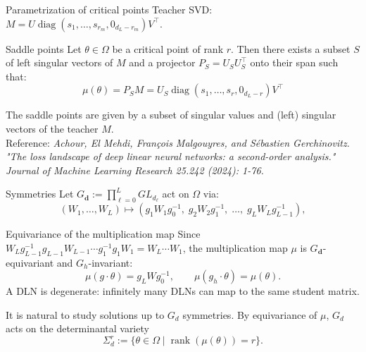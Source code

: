 \documentclass[aspectratio=169,11pt]{beamer}
\begin{document}
\begin{frame}{Parametrization of critical points}
Teacher SVD: \(M=U\operatorname{diag}(s_1,\ldots,s_{r_m},0_{d_L-r_m})V^{\top}\).
\begin{block}{Saddle points}
    Let $\theta\in\Omega$ be a critical point of rank $r$. Then there exists a subset $S$ of left singular vectors of $M$ and a projector $P_S=U_S U_S^{\top}$ onto their span such that:
    \[
    \mu(\theta) = P_S M = U_S\operatorname{diag}(s_1,\ldots,s_{r},0_{d_L-r})V^{\top}
    \]
\end{block}
The saddle points are given by a subset of singular values and (left) singular vectors of the teacher $M$.
\\
Reference: \textit{Achour, El Mehdi, François Malgouyres, and Sébastien Gerchinovitz. "The loss landscape of deep linear neural networks: a second-order analysis." Journal of Machine Learning Research 25.242 (2024): 1-76.}
\end{frame}
\begin{frame}{Symmetries}
Let $G_{\mathbf{d}}:=\prod_{\ell=0}^{L} GL_{d_\ell}$ act on $\Omega$ via:
\[
(W_1,\dots,W_L)\mapsto (g_1W_1g_0^{-1},\; g_2W_2g_1^{-1},\;\dots,\; g_L W_L g_{L-1}^{-1}),
\]
\begin{block}{Equivariance of the multiplication map}
    Since \(W_Lg_{L-1}^{-1}g_{L-1}W_{L-1}\cdots g_1^{-1}g_1W_1=W_L\cdots W_1\), the multiplication map $\mu$ is $G_{\mathbf{d}}$-equivariant and $G_h$-invariant:
    \[
    \mu(g\cdot \theta)=g_L W g_0^{-1},
    \qquad
    \mu(g_h\cdot \theta) = \mu(\theta).
    \]
A DLN is degenerate: infinitely many DLNs can map to the same student matrix.
\end{block}
It is natural to study solutions up to $G_d$ symmetries. By equivariance of $\mu$, $G_d$ acts on the determinantal variety
\[
\Sigma_d^{r}:=\{\theta\in \Omega\mid\operatorname{rank}(\mu(\theta)) = r\}.
\]
\end{frame}

\end{document}
